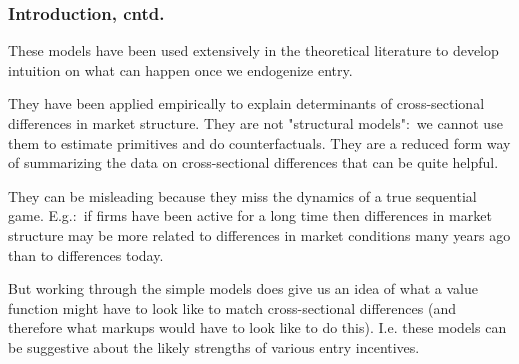 \begin{frame}%

\frametitle{Introduction, cntd.}

These models have been used extensively in the theoretical literature to
develop intuition on what can happen once we endogenize entry.

\bigskip

They have been applied empirically to explain determinants of
cross-sectional differences in market structure. They are not "structural
models":\ we cannot use them to estimate primitives and do counterfactuals.
They are a reduced form way of summarizing the data on cross-sectional
differences that can be quite helpful.

\bigskip

They can be misleading because they miss the dynamics of a true sequential
game. E.g.:\ if firms have been active for a long time then differences in
market structure may be more related to differences in market conditions
many years ago than to differences today.

\bigskip

But working through the simple models does give us an idea of what a value
function might have to look like to match cross-sectional differences (and
therefore what markups would have to look like to do this). I.e. these
models can be suggestive about the likely strengths of various entry
incentives.

\end{frame}%

